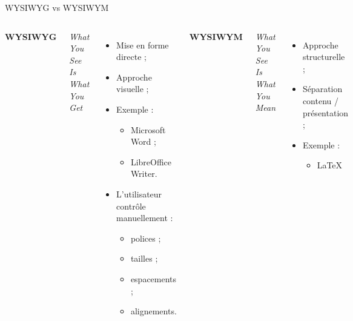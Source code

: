 \documentclass[aspectratio=169]{beamer}
\begin{document}
	\begin{frame}{WYSIWYG vs WYSIWYM}
		\begin{columns}[T]
			
			
			\textbf{WYSIWYG}
			
			\vspace{0.2cm}
			
			\small
			\emph{What You See Is What You Get}
			
			\vspace{0.3cm}
			
			\begin{itemize}
				\item Mise en forme directe ;
				\item Approche visuelle ;
				\item Exemple :
				\begin{itemize}
					\item Microsoft Word ;
					\item LibreOffice Writer.
				\end{itemize}
				
				\vspace{0.2cm}
				
				\item L’utilisateur contrôle manuellement :
				\begin{itemize}
					\item polices ;
					\item tailles ;
					\item espacements ;
					\item alignements.
				\end{itemize}
			\end{itemize}
			
			
			\textbf{WYSIWYM}
			
			\vspace{0.2cm}
			
			\small
			\emph{What You See Is What You Mean}
			
			\vspace{0.3cm}
			
			\begin{itemize}
				\item Approche structurelle ;
				\item Séparation contenu / présentation ;
				\item Exemple :
				\begin{itemize}
					\item \LaTeX{}
				\end{itemize}
				

\end{itemize}
\end{columns}
\end{frame}
\end{document}
